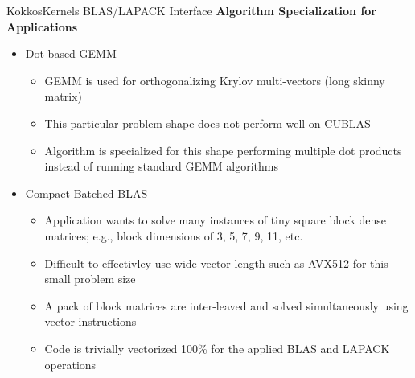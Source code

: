 \begin{frame}[fragile]{KokkosKernels BLAS/LAPACK Interface}
  \textbf{Algorithm Specialization for Applications}
  \begin{itemize}
    \item Dot-based GEMM
    \begin{itemize}
	    \item \small{GEMM is used for orthogonalizing Krylov multi-vectors (long skinny matrix)}
      \item \small{This particular problem shape does not perform well on CUBLAS}
      \item \small{Algorithm is specialized for this shape performing multiple dot
      products instead of running standard GEMM algorithms}
    \end{itemize}
    \item Compact Batched BLAS
    \begin{itemize}
      \item \small{Application wants to solve many instances of tiny square block dense
      matrices; e.g., block dimensions of 3, 5, 7, 9, 11, etc.}
      \item \small{Difficult to effectivley use wide vector length such as AVX512 for
      this small problem size}
      \item \small{A pack of block matrices are inter-leaved and solved simultaneously
      using vector instructions}
      \item \small{Code is trivially vectorized 100\% for the applied BLAS and LAPACK operations}
    \end{itemize}
  \end{itemize}
\end{frame}

